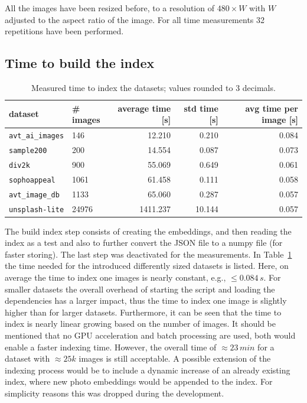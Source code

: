 \documentclass{article}
\begin{document}
All the images have been resized before, to a resolution of $480\times W$ with $W$ adjusted to the aspect ratio of the image.
For all time measurements 32 repetitions have been performed.

\subsection{Time to build the index}

\begin{table}[htb!]
\centering
\caption{Measured time to index the datasets; values rounded to 3 decimals.}
\label{tbl:measured_time_to_index_the_datasets_}
\begin{tabular}{llrrr}
\toprule
dataset                  & \# images & average time [s] & std time [s] & avg time per image [s] \\
\midrule
\texttt{avt\_ai\_images} & 146       & 12.210            & 0.210         & 0.084 \\
\texttt{sample200}       & 200       & 14.554           & 0.087        & 0.073 \\
\texttt{div2k}           & 900       & 55.069           & 0.649        & 0.061 \\
\texttt{sophoappeal}     & 1061      & 61.458           & 0.111        & 0.058 \\
\texttt{avt\_image\_db}  & 1133      & 65.060            & 0.287        & 0.057 \\
\texttt{unsplash-lite}   & 24976     & 1411.237         & 10.144       & 0.057 \\
\bottomrule
\end{tabular}
\end{table}


The build index step consists of creating the embeddings, and then reading the index as a test and also to further convert the JSON file to a numpy file (for faster storing). The last step was deactivated for the measurements.
In Table~\ref{tbl:measured_time_to_index_the_datasets_} the time needed for the introduced differently sized datasets is listed.
Here, on average the time to index one images is nearly constant, e.g., $\leq 0.084\,s$.
For smaller datasets the overall overhead of starting the script and loading the dependencies has a larger impact, thus the time to index one image is slightly higher than for larger datasets.
Furthermore, it can be seen that the time to index is nearly linear growing based on the number of images.
It should be mentioned that no GPU acceleration and batch processing are used, both would enable a faster indexing time.
However, the overall time of $\approx23\,min$ for a dataset with $\approx 25k$ images is still acceptable.
A possible extension of the indexing process would be to include a dynamic increase of an already existing index, where new photo embeddings would be appended to the index.
For simplicity reasons this was dropped during the development.
\end{document}

